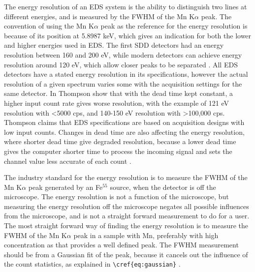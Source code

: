 The energy resolution of an EDS system is the ability to distinguish two lines at different energies, and is measured by the FWHM of the Mn K$\alpha$ peak.
The convention of using the Mn K$\alpha$ peak as the reference for the energy resolution is because of its position at 5.8987 keV, which gives an indication for both the lower and higher energies used in EDS.
The first SDD detectors had an energy resolution between 160 and 200 eV, while modern detectors can achieve energy resolution around 120 eV, which allow closer peaks to be separated \cite{keith_energy_res_2013} .
All EDS detectors have a stated energy resolution in its specifications, however the actual resolution of a given spectrum varies some with the acquisition settings for the same detector.
In \cite{keith_energy_res_2013} Thompson show that with the dead time kept constant, a higher input count rate gives worse resolution, with the example of 121 eV resolution with <5000 cps, and 140-150 eV resolution with >100,000 cps.
Thompson claims that EDS specifications are based on acquisition designs with low input counts.
Changes in dead time are also affecting the energy resolution, where shorter dead time give degraded resolution, because a lower dead time gives the computer shorter time to process the incoming signal and sets the channel value less accurate of each count .




The industry standard for the energy resolution is to measure the FWHM of the Mn K$\alpha$ peak generated by an Fe$^{55}$ source, when the detector is off the microscope.
The energy resolution is not a function of the microscope, but measuring the energy resolution off the microscope negates all possible influences from the microscope, and is not a straight forward measurement to do for a user.
The most straight forward way of finding the energy resolution is to measure the FWHM of the Mn K$\alpha$ peak in a sample with Mn, preferably with high concentration as that provides a well defined peak.
The FWHM measurement should be from a Gaussian fit of the peak, because it cancels out the influence of the count statistics, as explained in \verb|\cref{eq:gaussian}| .


